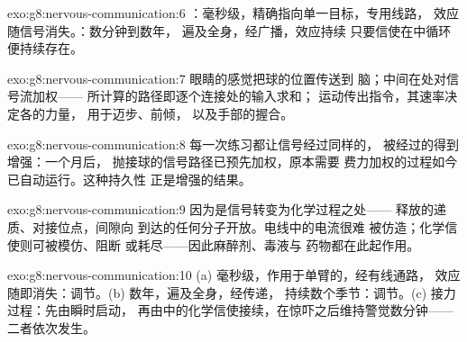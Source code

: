 \begin{solution}{exo:g8:nervous-communication:6}
：毫秒级，精确指向单一目标，专用线路，
效应随信号消失。：数分钟到数年，
遍及全身，经广播，效应持续
只要信使在中循环便持续存在。
\end{solution}

\begin{solution}{exo:g8:nervous-communication:7}
眼睛的感觉把球的位置传送到
脑；中间在处对信号流加权——
所计算的路径即逐个连接处的输入求和；
运动传出指令，其速率决定各的力量，
用于迈步、前倾，
以及手部的握合。
\end{solution}

\begin{solution}{exo:g8:nervous-communication:8}
每一次练习都让信号经过同样的，
被经过的得到增强：一个月后，
抛接球的信号路径已预先加权，原本需要
费力加权的过程如今已自动运行。这种持久性
正是增强的结果。
\end{solution}

\begin{solution}{exo:g8:nervous-communication:9}
因为是信号转变为化学过程之处——
释放的递质、对接位点，间隙向
到达的任何分子开放。电线中的电流很难
被仿造；化学信使则可被模仿、阻断
或耗尽——因此麻醉剂、毒液与
药物都在此起作用。
\end{solution}

\begin{solution}{exo:g8:nervous-communication:10}
(a) 毫秒级，作用于单臂的，经有线通路，
效应随即消失：调节。(b) 数年，遍及全身，经传递，
持续数个季节：调节。(c) 接力过程：先由瞬时启动，
再由中的化学信使接续，在惊吓之后维持警觉数分钟——
二者依次发生。
\end{solution}


